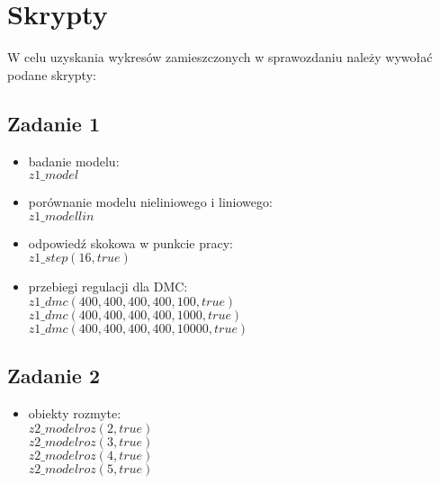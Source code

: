 \chapter{Skrypty}
	\label{ch:skrypty}
	W celu uzyskania wykresów zamieszczonych w sprawozdaniu należy wywołać podane skrypty:
	\section{Zadanie 1}
	\begin{itemize}
		\item badanie modelu:\\
		$z1\_model$
		\item porównanie modelu nieliniowego i liniowego:\\
		$z1\_modellin$
		\item odpowiedź skokowa w punkcie pracy:\\
		$z1\_step(16, true)$
		\item przebiegi regulacji dla DMC:\\
		$z1\_dmc(400, 400, 400, 400, 100, true)$\\
		$z1\_dmc(400, 400, 400, 400, 1000, true)$\\
		$z1\_dmc(400, 400, 400, 400, 10000, true)$\\	
	\end{itemize}
	\section{Zadanie 2}
	\begin{itemize}
		\item obiekty rozmyte:\\
		$z2\_modelroz(2, true)$\\
		$z2\_modelroz(3, true)$\\
		$z2\_modelroz(4, true)$\\
		$z2\_modelroz(5, true)$\\
	\end{itemize}